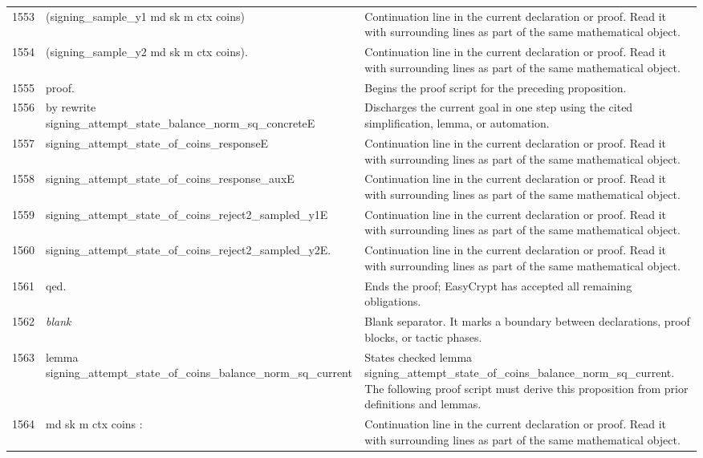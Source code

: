 \documentclass[10pt]{article}
\begin{document}
\begin{longtable}{r L{0.53\textwidth} L{0.37\textwidth}}
1553 & {\ttfamily\scriptsize     (signing\_sample\_y1 md sk m ctx coins)} & Continuation line in the current declaration or proof.  Read it with surrounding lines as part of the same mathematical object. \\
1554 & {\ttfamily\scriptsize     (signing\_sample\_y2 md sk m ctx coins).} & Continuation line in the current declaration or proof.  Read it with surrounding lines as part of the same mathematical object. \\
1555 & {\ttfamily\scriptsize proof.} & Begins the proof script for the preceding proposition. \\
1556 & {\ttfamily\scriptsize by rewrite signing\_attempt\_state\_balance\_norm\_sq\_concreteE} & Discharges the current goal in one step using the cited simplification, lemma, or automation. \\
1557 & {\ttfamily\scriptsize            signing\_attempt\_state\_of\_coins\_responseE} & Continuation line in the current declaration or proof.  Read it with surrounding lines as part of the same mathematical object. \\
1558 & {\ttfamily\scriptsize            signing\_attempt\_state\_of\_coins\_response\_auxE} & Continuation line in the current declaration or proof.  Read it with surrounding lines as part of the same mathematical object. \\
1559 & {\ttfamily\scriptsize            signing\_attempt\_state\_of\_coins\_reject2\_sampled\_y1E} & Continuation line in the current declaration or proof.  Read it with surrounding lines as part of the same mathematical object. \\
1560 & {\ttfamily\scriptsize            signing\_attempt\_state\_of\_coins\_reject2\_sampled\_y2E.} & Continuation line in the current declaration or proof.  Read it with surrounding lines as part of the same mathematical object. \\
1561 & {\ttfamily\scriptsize qed.} & Ends the proof; EasyCrypt has accepted all remaining obligations. \\
1562 & {\ttfamily\scriptsize \emph{blank}} & Blank separator.  It marks a boundary between declarations, proof blocks, or tactic phases. \\
1563 & {\ttfamily\scriptsize lemma signing\_attempt\_state\_of\_coins\_balance\_norm\_sq\_current} & States checked lemma signing\_attempt\_state\_of\_coins\_balance\_norm\_sq\_current.  The following proof script must derive this proposition from prior definitions and lemmas. \\
1564 & {\ttfamily\scriptsize    md sk m ctx coins :} & Continuation line in the current declaration or proof.  Read it with surrounding lines as part of the same mathematical object. \\

\end{longtable}
\end{document}
